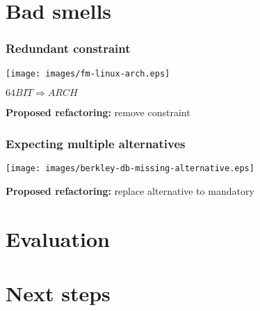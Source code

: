 \documentclass{beamer}
\begin{document}
\section[Outline]{}

\frame{\tableofcontents}

\section{Bad smells}

\begin{frame}

\frametitle{Redundant constraint}

\begin{center}
  \texttt{[image: images/fm-linux-arch.eps]}

$64BIT \Rightarrow ARCH$

\end{center}

{\bf Proposed refactoring:} remove constraint
\end{frame}

\begin{frame}

\frametitle{Expecting multiple alternatives}

\begin{center}
  \texttt{[image: images/berkley-db-missing-alternative.eps]}
\end{center}

{\bf Proposed refactoring:} replace alternative to mandatory


\end{frame}

\section{Evaluation}

\section{Next steps}
\end{document}
